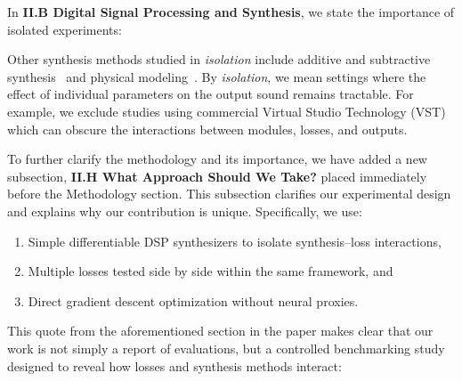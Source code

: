 \documentclass[11pt]{article}
\begin{document}
\medskip
\noindent In \textbf{II.B Digital Signal Processing and Synthesis}, we state the importance of isolated experiments:
\begin{displayquote}
    
Other synthesis methods studied in \textit{isolation} include additive and subtractive synthesis~\cite{engel2020ddsp,masuda2023improving,salimi2020make} and physical modeling~\cite{riionheimo2003parameter,han2024learning}. By \textit{isolation}, we mean settings where the effect of individual parameters on the output sound remains tractable. For example, we exclude studies using commercial Virtual Studio Technology (VST) which can obscure the interactions between modules, losses, and outputs. 
\end{displayquote}

\noindent To further clarify the methodology and its importance, we have added a new subsection, \textbf{II.H What Approach Should We Take?} placed immediately before the Methodology section. This subsection clarifies our experimental design and explains why our contribution is unique. Specifically, we use:  
\begin{enumerate}
  \item Simple differentiable DSP synthesizers to isolate synthesis--loss interactions,  
  \item Multiple losses tested side by side within the same framework, and  
  \item Direct gradient descent optimization without neural proxies.  
\end{enumerate}

This quote from the aforementioned section in the paper makes clear that our work is not simply a report of evaluations, but a controlled benchmarking study designed to reveal how losses and synthesis methods interact: 
\end{document}
